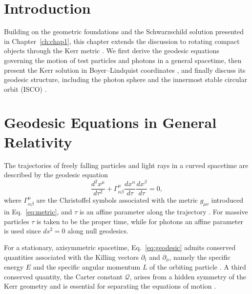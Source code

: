 \cleardoublepage
{}
{}
\ChapterHeader

\section{Introduction}
\label{ch:chap2}
Building on the geometric foundations and the Schwarzschild solution presented in Chapter~\ref{ch:chap1}, this chapter extends the discussion to rotating compact objects through the Kerr metric \cite{kerr1963}. We first derive the geodesic equations governing the motion of test particles and photons in a general spacetime, then present the Kerr solution in Boyer--Lindquist coordinates \cite{boyerlindquist1967}, and finally discuss its geodesic structure, including the photon sphere and the innermost stable circular orbit (ISCO) \cite{bardeen1972}.

\section{Geodesic Equations in General Relativity}

The trajectories of freely falling particles and light rays in a curved spacetime are described by the geodesic equation
\begin{equation}
	\frac{d^2 x^{\mu}}{d\tau^2} + \Gamma^{\mu}_{\alpha\beta}\frac{dx^{\alpha}}{d\tau}\frac{dx^{\beta}}{d\tau} = 0,
	\label{eq:geodesic}
\end{equation}
where $\Gamma^{\mu}_{\alpha\beta}$ are the Christoffel symbols  associated with the metric $g_{\mu\nu}$ introduced in Eq.~\eqref{eq:metric}, and $\tau$ is an affine parameter along the trajectory \cite{misner1973}. For massive particles $\tau$ is taken to be the proper time, while for photons an affine parameter is used since $ds^2=0$ along null geodesics.

For a stationary, axisymmetric spacetime, Eq.~\eqref{eq:geodesic} admits conserved quantities associated with the Killing vectors $\partial_t$ and $\partial_\phi$, namely the specific energy $E$ and the specific angular momentum $L$ of the orbiting particle \cite{wald1984}. A third conserved quantity, the Carter constant $\mathcal{Q}$, arises from a hidden symmetry of the Kerr geometry and is essential for separating the equations of motion \cite{carter1968}.

